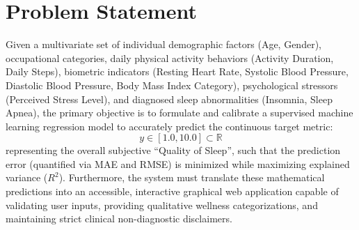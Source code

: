 \documentclass[12pt,a4paper]{article}
\begin{document}
\section{Problem Statement}
Given a multivariate set of individual demographic factors (Age, Gender), occupational categories, daily physical activity behaviors (Activity Duration, Daily Steps), biometric indicators (Resting Heart Rate, Systolic Blood Pressure, Diastolic Blood Pressure, Body Mass Index Category), psychological stressors (Perceived Stress Level), and diagnosed sleep abnormalities (Insomnia, Sleep Apnea), the primary objective is to formulate and calibrate a supervised machine learning regression model to accurately predict the continuous target metric:
\begin{equation}
    y \in [1.0, 10.0] \subset \mathbb{R}
\end{equation}
representing the overall subjective ``Quality of Sleep'', such that the prediction error (quantified via MAE and RMSE) is minimized while maximizing explained variance ($R^2$). Furthermore, the system must translate these mathematical predictions into an accessible, interactive graphical web application capable of validating user inputs, providing qualitative wellness categorizations, and maintaining strict clinical non-diagnostic disclaimers.

\end{document}
